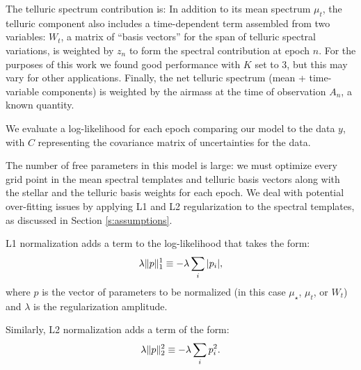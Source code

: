 \documentclass[twocolumn]{aastex62}
\begin{document}
The telluric spectrum contribution is:
In addition to its mean spectrum $\mu_t$, the telluric component also includes a time-dependent term assembled from two variables: $W_t$, a matrix of ``basis vectors'' for the span of telluric spectral variations, is weighted by $z_n$ to form the spectral contribution at epoch $n$. 
For the purposes of this work we found good performance with $K$ set to 3, but this may vary for other applications. 
Finally, the net telluric spectrum (mean + time-variable components) is weighted by the airmass at the time of observation $A_n$, a known quantity.

We evaluate a log-likelihood for each epoch
comparing our model  to the data $y$, with $C$ representing the covariance matrix of uncertainties for the data. 

The number of free parameters in this model is large: we must optimize every grid point in the mean spectral templates and telluric basis vectors along with the stellar \RV and the telluric basis weights for each epoch. 
We deal with potential over-fitting issues by applying L1 and L2 regularization to the spectral templates, as discussed in Section \ref{s:assumptions}. 

L1 normalization adds a term to the log-likelihood that takes the form:
\begin{equation}
\Lone{\lambda}{p} \equiv -\lambda \sum_{i} | p_{i} | ,
\end{equation}
where $p$ is the vector of parameters to be normalized (in this case $\mu_{\star}$, $\mu_{t}$, or $W_{t}$) and $\lambda$ is the regularization amplitude.

Similarly, L2 normalization adds a term of the form:
\begin{equation}
\Ltwo{\lambda}{p} \equiv -\lambda \sum_{i} p_{i}^2 .
\end{equation}
\end{document}
